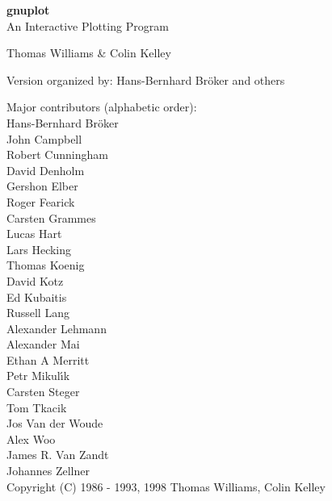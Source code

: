 \documentclass[twoside]{article}
\def\gnuplotVersion{\usebox\GpVersion}
\begin{document}
\sloppy
\thispagestyle{empty}
\rule{0in}{1.0in}

  \begin{center}

  {\huge\bf gnuplot}\\
  \vspace{3ex}
  {\Large An Interactive Plotting Program}\\

  \vspace{2ex}

  \large
  Thomas Williams \& Colin Kelley\\

  \vspace{2ex}

  Version
    \gnuplotVersion
  organized by: Hans-Bernhard Br\"oker and others\\

   \vspace{2ex}

  Major contributors (alphabetic order):\\

  Hans-Bernhard Br\"oker \\
  John Campbell\\
  Robert Cunningham\\
  David Denholm\\
  Gershon Elber\\
  Roger Fearick\\
  Carsten Grammes\\
  Lucas Hart \\
  Lars Hecking \\
  Thomas Koenig\\
  David Kotz\\
  Ed Kubaitis\\
  Russell Lang\\
  Alexander Lehmann\\
  Alexander Mai \\
  Ethan A Merritt \\
  Petr Mikul\'{\i}k\\
  Carsten Steger\\
  Tom Tkacik\\
  Jos Van der Woude\\
  Alex Woo\\
  James R. Van Zandt\\
  Johannes Zellner\\
  Copyright (C) 1986 - 1993, 1998   Thomas Williams, Colin Kelley\\


\end{center}
\end{document}
